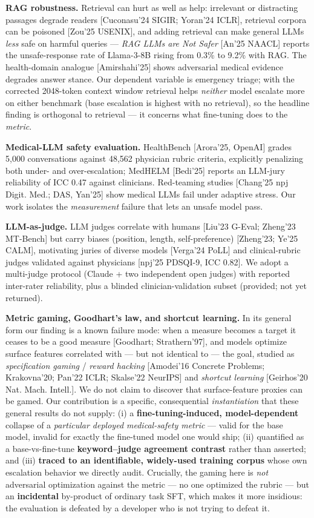\documentclass[11pt]{article}
\begin{document}
\textbf{RAG robustness.} Retrieval can hurt as well as help: irrelevant or distracting passages degrade readers [Cuconasu'24 SIGIR; Yoran'24 ICLR], retrieval corpora can be poisoned [Zou'25 USENIX], and adding retrieval can make general LLMs \textit{less} safe on harmful queries --- \textit{RAG LLMs are Not Safer} [An'25 NAACL] reports the unsafe-response rate of Llama-3-8B rising from 0.3\% to 9.2\% with RAG. The health-domain analogue [Amirshahi'25] shows adversarial medical evidence degrades answer stance. Our dependent variable is emergency triage; with the corrected 2048-token context window retrieval helps \textit{neither} model escalate more on either benchmark (base escalation is highest with no retrieval), so the headline finding is orthogonal to retrieval --- it concerns what fine-tuning does to the \textit{metric}.


\textbf{Medical-LLM safety evaluation.} HealthBench [Arora'25, OpenAI] grades 5,000 conversations against 48,562 physician rubric criteria, explicitly penalizing both under- and over-escalation; MedHELM [Bedi'25] reports an LLM-jury reliability of ICC 0.47 against clinicians. Red-teaming studies [Chang'25 npj Digit. Med.; DAS, Yan'25] show medical LLMs fail under adaptive stress. Our work isolates the \textit{measurement} failure that lets an unsafe model pass.


\textbf{LLM-as-judge.} LLM judges correlate with humans [Liu'23 G-Eval; Zheng'23 MT-Bench] but carry biases (position, length, self-preference) [Zheng'23; Ye'25 CALM], motivating juries of diverse models [Verga'24 PoLL] and clinical-rubric judges validated against physicians [npj'25 PDSQI-9, ICC 0.82]. We adopt a multi-judge protocol (Claude + two independent open judges) with reported inter-rater reliability, plus a blinded clinician-validation subset (provided; not yet returned).


\textbf{Metric gaming, Goodhart's law, and shortcut learning.} In its general form our finding is a known failure mode: when a measure becomes a target it ceases to be a good measure [Goodhart; Strathern'97], and models optimize surface features correlated with --- but not identical to --- the goal, studied as \textit{specification gaming} / \textit{reward hacking} [Amodei'16 Concrete Problems; Krakovna'20; Pan'22 ICLR; Skalse'22 NeurIPS] and \textit{shortcut learning} [Geirhos'20 Nat. Mach. Intell.]. We do not claim to discover that surface-feature proxies can be gamed. Our contribution is a specific, consequential \textit{instantiation} that these general results do not supply: (i) a \textbf{fine-tuning-induced, model-dependent} collapse of a \textit{particular deployed medical-safety metric} --- valid for the base model, invalid for exactly the fine-tuned model one would ship; (ii) quantified as a base-vs-fine-tune \textbf{keyword--judge agreement contrast} rather than asserted; and (iii) \textbf{traced to an identifiable, widely-used training corpus} whose own escalation behavior we directly audit. Crucially, the gaming here is \textit{not} adversarial optimization against the metric --- no one optimized the rubric --- but an \textbf{incidental} by-product of ordinary task SFT, which makes it more insidious: the evaluation is defeated by a developer who is not trying to defeat it.
\end{document}
